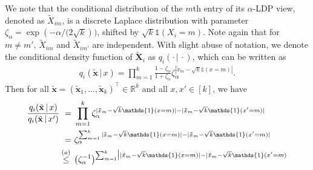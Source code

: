 \documentclass[twoside,11pt]{article}
\newcommand{\vectorize}[1]{\mathbf{#1}}
\newcommand{\private}[1]{\tilde{#1}}
\newcommand{\rvX}{X} %
\newcommand{\rvXRealized}{x}
\newcommand{\rVecX}{\vectorize{\rvX}}
\newcommand{\rVecXRealized}{\vectorize{\rvXRealized}}
\newcommand{\rVecXPriv}{\tilde{\rVecX}} %
\newcommand{\rVecXPrivRealized}{\tilde{\rVecXRealized}} %
\newcommand{\sampleIndexOne}{i}
\newcommand{\alphabetSize}{k} %
\newcommand{\vectorIndex}{m}
\newcommand{\privacyDensity}{q}
\newcommand{\privacyParameter}{\alpha} %
\newcommand{\distparamDiscLap}{\zeta}%
\newcommand{\discLapUParam}{\distparamDiscLap_{\privacyParameter}}
\begin{document}
\begin{appendix}
	We note that the conditional distribution of the $\vectorIndex$th entry of its $\privacyParameter$-LDP view,
	denoted as $\private{X}_{im}$,
	is a discrete Laplace distribution with parameter
	$\discLapUParam = \exp({
		-\privacyParameter/(2\sqrt{\alphabetSize}}))$,
	shifted by $\sqrt{\alphabetSize}\mathds{1}(\rvX_i = \vectorIndex)$.
	Note again that for $m \neq m'$, $\private{X}_{im}$ and $\private{X}_{im'}$ are independent.
	With slight abuse of notation, we denote the conditional density function of $\rVecXPriv_{i}$ as $\privacyDensity_\sampleIndexOne(\cdot \,|\, \cdot)$, which can be written as 
	\begin{align*}
		\privacyDensity_\sampleIndexOne(
		\rVecXPrivRealized
		\,|\,
		\rvXRealized
		)
		= 
		\prod_{\vectorIndex=1}^\alphabetSize
		\frac{
			1 - \discLapUParam
		}{
			1 + \discLapUParam
		}
		\discLapUParam^{
			|
			\private{x}_{m}
			-
			\sqrt{\alphabetSize} \mathds{1}(\rvXRealized = \vectorIndex)
			|
		}.
	\end{align*}
	Then for all $\rVecXPrivRealized =(\rVecXPrivRealized_1,\ldots,\rVecXPrivRealized_\alphabetSize)^\top \in \mathbb{R}^\alphabetSize$
	and all $\rvXRealized, \rvXRealized' \in [\alphabetSize]$, we have
	\begin{align*}
		\frac{
			\privacyDensity_\sampleIndexOne(
			\rVecXPrivRealized
			\,|\,
			\rvXRealized
			)
		}{
			\privacyDensity_\sampleIndexOne(
			\rVecXPrivRealized
			\,|\,
			\rvXRealized'
			)
		}
		~=~ &
		\prod_{\vectorIndex=1}^\alphabetSize
		\discLapUParam^{
			|
			\private{x}_{m}
			-
			\sqrt{\alphabetSize} \mathds{1}(\rvXRealized = \vectorIndex)
			|
			-
			|
			\private{x}_{m}
			-
			\sqrt{\alphabetSize} \mathds{1}(\rvXRealized' = \vectorIndex)
			|
		}
		\\ = ~ &
		\discLapUParam^{
			\sum_{\vectorIndex=1}^\alphabetSize
			|
			\private{x}_{m}
			-
			\sqrt{\alphabetSize} \mathds{1}(\rvXRealized = \vectorIndex)
			|
			-
			|
			\private{x}_{m}
			-
			\sqrt{\alphabetSize} \mathds{1}(\rvXRealized' = \vectorIndex)
			|
		}
		\\ \stackrel{(a)}{\leq} \hskip 1.57mm &
		\bigl(
		\discLapUParam^{-1}
		\bigr)^{\sum_{\vectorIndex=1}^\alphabetSize
			\bigl|
			|
			\private{x}_{m}
			-
			\sqrt{\alphabetSize} \mathds{1}(\rvXRealized = \vectorIndex)
			|
			-
			|
			\private{x}_{m}
			-
			\sqrt{\alphabetSize} \mathds{1}(\rvXRealized' =\vectorIndex)
}
\end{align*}
\end{appendix}
\end{document}

